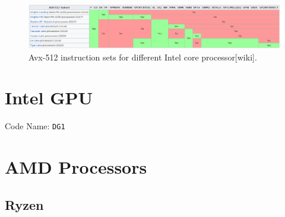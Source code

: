 \documentclass[10pt,onecolumn,conference]{IEEEtran}
\begin{document}

\begin{figure}[!bth]
\centering
\includegraphics[width=1.0\textwidth]{Figures/avx_instruction.png}
\caption{Avx-512 instruction sets for different Intel core processor[wiki].}
\label{fig:avxinstruction}
\end{figure}

\section{Intel GPU}
Code Name: \texttt{DG1}\\


\section{AMD Processors}

\subsection{Ryzen}
\end{document}
